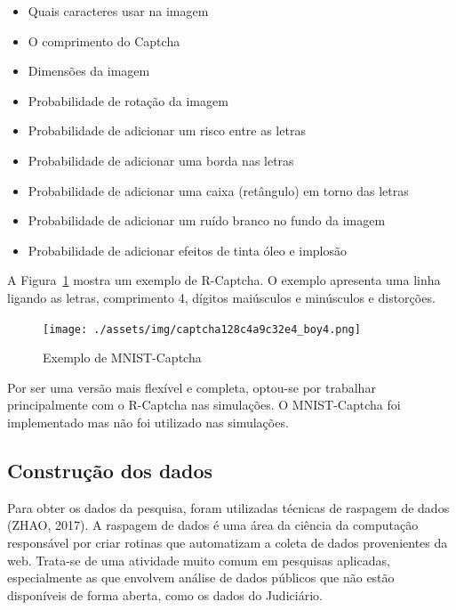 \documentclass[12pt,twoside,brazilian]{book}
\providecommand{\tightlist}{%
  \setlength{\itemsep}{0pt}\setlength{\parskip}{0pt}}
\begin{document}
\begin{itemize}
\tightlist
\item
  Quais caracteres usar na imagem
\item
  O comprimento do Captcha
\item
  Dimensões da imagem
\item
  Probabilidade de rotação da imagem
\item
  Probabilidade de adicionar um risco entre as letras
\item
  Probabilidade de adicionar uma borda nas letras
\item
  Probabilidade de adicionar uma caixa (retângulo) em torno das letras
\item
  Probabilidade de adicionar um ruído branco no fundo da imagem
\item
  Probabilidade de adicionar efeitos de tinta óleo e implosão
\end{itemize}

A Figura~\ref{fig-captcha-r} mostra um exemplo de R-Captcha. O exemplo
apresenta uma linha ligando as letras, comprimento 4, dígitos maiúsculos
e minúsculos e distorções.

\begin{figure}

{\centering \texttt{[image: ./assets/img/captcha128c4a9c32e4\_boy4.png]}

}

\caption{\label{fig-captcha-r}Exemplo de MNIST-Captcha}

\end{figure}

Por ser uma versão mais flexível e completa, optou-se por trabalhar
principalmente com o R-Captcha nas simulações. O MNIST-Captcha foi
implementado mas não foi utilizado nas simulações.

\hypertarget{construuxe7uxe3o-dos-dados}{%
\subsection{Construção dos dados}\label{construuxe7uxe3o-dos-dados}}

Para obter os dados da pesquisa, foram utilizadas técnicas de raspagem
de dados (ZHAO, 2017). A raspagem de dados é uma área da ciência da
computação responsável por criar rotinas que automatizam a coleta de
dados provenientes da web. Trata-se de uma atividade muito comum em
pesquisas aplicadas, especialmente as que envolvem análise de dados
públicos que não estão disponíveis de forma aberta, como os dados do
Judiciário.
\end{document}
